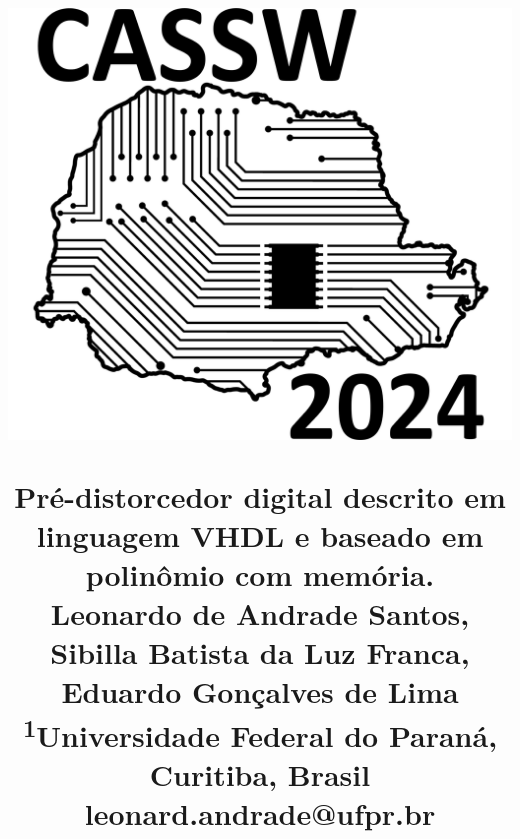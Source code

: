 \renewcommand{\thesubsection}{\Alph{subsection}}
\renewcommand{\thesection}{\Roman{section}}
\renewcommand{\figurename}{Fig.}
\renewcommand{\tablename}{TABELA}
\usepackage{geometry}
 \geometry{
     a4paper,
     left=16mm,
     top=19mm,
     right=16mm,
     bottom=25.4mm
 }
\graphicspath{{Figuras/}}
\title{
    \begin{minipage}[c]{0.3\textwidth} 
          \includegraphics[width=\textwidth]{Semicro_title.png} 
    \end{minipage}\begin{minipage}[c]{0.7\textwidth} 
             \begin{center}
                \Huge
                Pré-distorcedor digital descrito em linguagem VHDL e baseado em polinômio com memória.\\
                \vspace{20pt}
                \Large
                Leonardo de Andrade Santos, Sibilla Batista da Luz Franca, Eduardo Gonçalves de Lima \\
                \normalsize
                  \textsuperscript{1}Universidade Federal do Paraná, Curitiba, Brasil \\
                  leonard.andrade@ufpr.br
             \end{center}
    \end{minipage}
}

\date{\vspace{-8em}}
\setlength\columnsep{2em}

